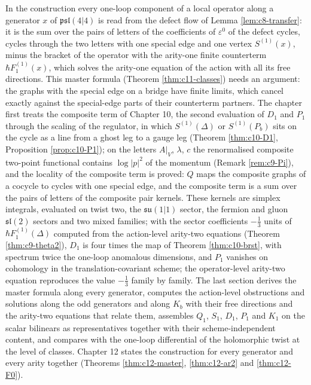 In the construction every one-loop component of a local operator along a generator $x$ of $\mathfrak{psl}(4|4)$ is read from the defect flow of Lemma \ref{lem:c8-transfer}: it is the sum over the pairs of letters of the coefficients of $\varepsilon^0$ of the defect cycles, cycles through the two letters with one special edge and one vertex $S^{(1)}(x)$, minus the bracket of the operator with the arity-one finite counterterm $\hbar F_1^{(1)}(x)$, which solves the arity-one equation of the action with all its free directions. This master formula (Theorem \ref{thm:c11-classes}) needs an argument: the graphs with the special edge on a bridge have finite limits, which cancel exactly against the special-edge parts of their counterterm partners. The chapter first treats the composite term of Chapter 10, the second evaluation of $D_1$ and $P_1$ through the scaling of the regulator, in which $S^{(1)}(\Delta)$ or $S^{(1)}(P_b)$ sits on the cycle as a line from a ghost leg to a gauge leg (Theorem \ref{thm:c10-D1}, Proposition \ref{prop:c10-P1}); on the letters $A|_V$, $\lambda$, $c$ the renormalised composite two-point functional contains $\log|p|^2$ of the momentum (Remark \ref{rem:c9-Pi}), and the locality of the composite term is proved: $Q$ maps the composite graphs of a cocycle to cycles with one special edge, and the composite term is a sum over the pairs of letters of the composite pair kernels. These kernels are simplex integrals, evaluated on twist two, the $\mathfrak{su}(1|1)$ sector, the fermion and gluon $\mathfrak{sl}(2)$ sectors and two mixed families; with the sector coefficients $-\tfrac13$ units of $\hbar F_1^{(1)}(\Delta)$ computed from the action-level arity-two equations (Theorem \ref{thm:c9-theta2}), $D_1$ is four times the map of Theorem \ref{thm:c10-brst}, with spectrum twice the one-loop anomalous dimensions, and $P_1$ vanishes on cohomology in the translation-covariant scheme; the operator-level arity-two equation reproduces the value $-\tfrac13$ family by family. The last section derives the master formula along every generator, computes the action-level obstructions and solutions along the odd generators and along $K_b$ with their free directions and the arity-two equations that relate them, assembles $Q_1$, $S_1$, $D_1$, $P_1$ and $K_1$ on the scalar bilinears as representatives together with their scheme-independent content, and compares with the one-loop differential of the holomorphic twist at the level of classes. Chapter 12 states the construction for every generator and every arity together (Theorems \ref{thm:c12-master}, \ref{thm:c12-ar2} and \ref{thm:c12-F0}).
